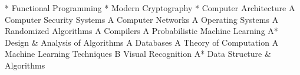 \begin{cvcourses}
  \cvcourserow
		{*}
    {Functional Programming}
		{*}
    {Modern Cryptography}
		{*}
    {Computer Architecture}
  \cvcourserow
		{A}
    {Computer Security Systems}
		{A}
    {Computer Networks}
		{A}
    {Operating Systems}
  \cvcourserow
		{A}
    {Randomized Algorithms}
		{A}
    {Compilers}
		{A}
    {Probabilistic Machine Learning}
  \cvcourserow
		{A*}
    {Design \& Analysis of Algorithms}
		{A}
    {Databases}
		{A}
    {Theory of Computation}
  \cvcourserow
		{A}
    {Machine Learning Techniques}
		{B}
    {Visual Recognition}
		{A*}
    {Data Structure \& Algorithms}
\end{cvcourses}
